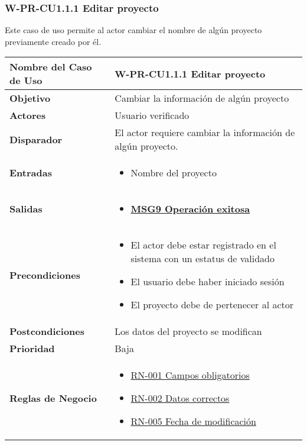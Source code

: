 \subsubsection{W-PR-CU1.1.1 Editar proyecto}
Este caso de uso permite al actor cambiar el nombre de algún proyecto previamente creado por él.

\begin{longtable}{|J{5cm}|J{10.3cm}|}
	\hline
	\textbf{Nombre del Caso de Uso} &
		W-PR-CU1.1.1 Editar proyecto \\ \hline
	\textbf{Objetivo} &
		Cambiar la información de algún proyecto \\ \hline
	\textbf{Actores} &
		Usuario verificado \\ \hline 
	\textbf{Disparador} & 
		El actor requiere cambiar la información de algún proyecto. \\ \hline 
	\textbf{Entradas} & 
		\begin{itemize}
				\item Nombre del proyecto
		\end{itemize}\\ \hline 
	\textbf{Salidas} & 
		\begin{itemize}
			\item \hyperref[MSG9]{\bf MSG9 Operación exitosa}
		\end{itemize} \\ \hline
	\textbf{Precondiciones} &
		\begin{itemize}
		    \item El actor debe estar registrado en el sistema con un estatus de validado
		    \item El usuario debe haber iniciado sesión
		    \item El proyecto debe de pertenecer al actor
		\end{itemize} \\ \hline
	\textbf{Postcondiciones} &
		Los datos del proyecto se modifican \\ \hline
	\textbf{Prioridad} & 
		Baja \\ \hline
	\textbf{Reglas de Negocio} & 
		\begin{itemize}
    		\item \hyperref[RN001]{RN-001 Campos obligatorios}
    		\item \hyperref[RN002]{RN-002 Datos correctos} 
    		\item \hyperref[RN005]{RN-005 Fecha de modificación}
    	\end{itemize}\\ \hline

\end{longtable}


